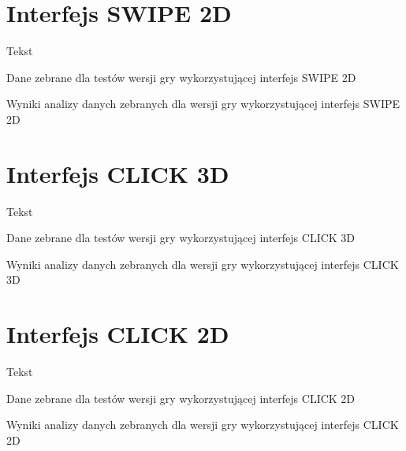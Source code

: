\documentclass[a4paper,12pt,numbers=noenddot]{report}
\begin{document}
\section{Interfejs SWIPE 2D}%
Tekst
\begin{table}
  \caption{Dane zebrane dla testów wersji gry wykorzystującej interfejs SWIPE 2D}
  \resizebox{0.9\textwidth}{!}{%
	
  }
  \label{tab:results_SWIPE2d}%
  
  
  \caption{Wyniki analizy danych zebranych dla wersji gry wykorzystującej interfejs SWIPE 2D}
  \resizebox{0.9\textwidth}{!}{%
	
  }
  \label{tab:analysis_SWIPE2d}%
\end{table}%

\section{Interfejs CLICK 3D}%
Tekst

\begin{table}
  \caption{Dane zebrane dla testów wersji gry wykorzystującej interfejs CLICK 3D}
  \resizebox{0.9\textwidth}{!}{%
	
  }
  \label{tab:results_CLICK3d}%
  \caption{Wyniki analizy danych zebranych dla wersji gry wykorzystującej interfejs CLICK 3D}
  \resizebox{0.9\textwidth}{!}{%
	
  }
  \label{tab:analysis_CLICK3d}%
\end{table}%

\section{Interfejs CLICK 2D}%
Tekst
\begin{table}
  \caption{Dane zebrane dla testów wersji gry wykorzystującej interfejs CLICK 2D}
  \resizebox{\textwidth}{!}{%
	
  }
  \label{tab:results_CLICK2d}%
  \caption{Wyniki analizy danych zebranych dla wersji gry wykorzystującej interfejs CLICK 2D}
  \resizebox{\textwidth}{!}{%
	
  }
  \label{tab:analysis_CLICK2d}%
\end{table}%
\end{document}

